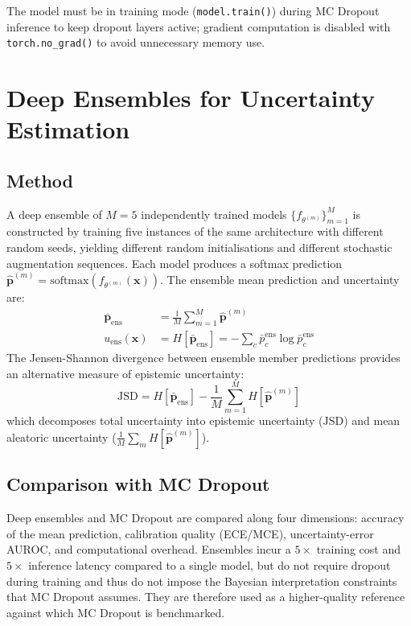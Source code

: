 The model must be in training mode (\texttt{model.train()}) during MC Dropout inference to keep dropout layers active; gradient computation is disabled with \texttt{torch.no\_grad()} to avoid unnecessary memory use.

\section{Deep Ensembles for Uncertainty Estimation}

\subsection{Method}

A deep ensemble of $M = 5$ independently trained models $\{f_{\theta^{(m)}}\}_{m=1}^{M}$ is constructed by training five instances of the same architecture with different random seeds, yielding different random initialisations and different stochastic augmentation sequences. Each model produces a softmax prediction $\hat{\mathbf{p}}^{(m)} = \text{softmax}(f_{\theta^{(m)}}(\mathbf{x}))$. The ensemble mean prediction and uncertainty are:
\begin{align}
    \bar{\mathbf{p}}_{\text{ens}} &= \frac{1}{M} \sum_{m=1}^{M} \hat{\mathbf{p}}^{(m)} \label{eq:ens_mean} \\
    u_{\text{ens}}(\mathbf{x}) &= H[\bar{\mathbf{p}}_{\text{ens}}] = -\sum_c \bar{p}_c^{\text{ens}} \log \bar{p}_c^{\text{ens}} \label{eq:ens_entropy}
\end{align}
The Jensen-Shannon divergence between ensemble member predictions provides an alternative measure of epistemic uncertainty:
\begin{equation}
    \text{JSD} = H[\bar{\mathbf{p}}_{\text{ens}}] - \frac{1}{M}\sum_{m=1}^{M} H[\hat{\mathbf{p}}^{(m)}]
\end{equation}
which decomposes total uncertainty into epistemic uncertainty ($\text{JSD}$) and mean aleatoric uncertainty ($\frac{1}{M}\sum_m H[\hat{\mathbf{p}}^{(m)}]$).

\subsection{Comparison with MC Dropout}

Deep ensembles and MC Dropout are compared along four dimensions: accuracy of the mean prediction, calibration quality (ECE/MCE), uncertainty-error AUROC, and computational overhead. Ensembles incur a $5\times$ training cost and $5\times$ inference latency compared to a single model, but do not require dropout during training and thus do not impose the Bayesian interpretation constraints that MC Dropout assumes. They are therefore used as a higher-quality reference against which MC Dropout is benchmarked.

